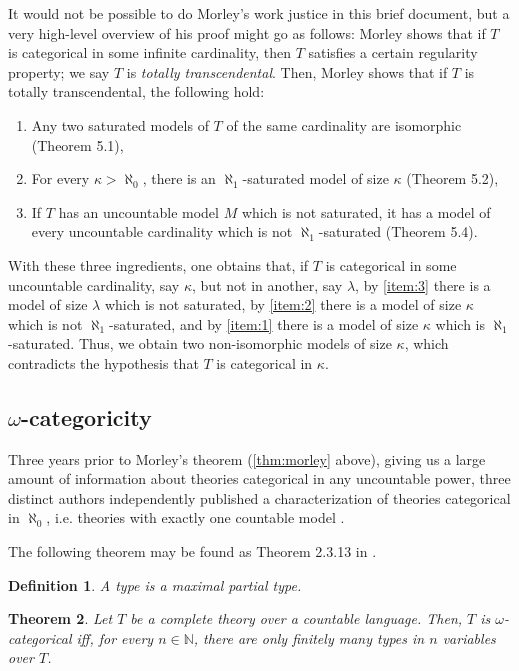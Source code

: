 \documentclass{article}
\newtheorem{theorem}{Theorem}[section]
\newtheorem{definition}[theorem]{Definition}
\theoremstyle{nonumberplain}
\newcommand{\N}{\mathbb{N}}
\begin{document}
It would not be possible to do Morley's work justice in this brief document, but a very high-level overview of his proof might go as follows: Morley shows that if $T$ is categorical in some infinite cardinality, then $T$ satisfies a certain regularity property; we say $T$ is \emph{totally transcendental}. Then, Morley shows that if $T$ is totally transcendental, the following hold:
\begin{enumerate}
\item\label{item:3} Any two saturated models of $T$ of the same cardinality are isomorphic (Theorem 5.1),
\item\label{item:1} For every $\kappa > \aleph_0$, there is an $\aleph_1$-saturated model of size $\kappa$ (Theorem 5.2),
\item	\label{item:2} If $T$ has an uncountable model $M$ which is not saturated, it has a model of every uncountable cardinality which is not $\aleph_1$-saturated (Theorem 5.4).
\end{enumerate}

With these three ingredients, one obtains that, if $T$ is categorical in some uncountable cardinality, say $\kappa$, but not in another, say $\lambda$, by \ref{item:3} there is a model of size $\lambda$ which is not saturated, by \ref{item:2} there is a model of size $\kappa$ which is not $\aleph_1$-saturated, and by \ref{item:1} there is a model of size $\kappa$ which is $\aleph_1$-saturated. Thus, we obtain two non-isomorphic models of size $\kappa$, which contradicts the hypothesis that $T$ is categorical in $\kappa$.

\subsection{$\omega$-categoricity}

Three years prior to Morley's theorem (\ref{thm:morley} above), giving us a large amount of information about theories categorical in any uncountable power, three distinct authors independently published a characterization of theories categorical in $\aleph_0$, i.e. theories with exactly one countable model \cite{primersimpletheories}.

The following theorem may be found as Theorem 2.3.13 in \cite{cnk}.

\begin{definition}
A \emph{type} is a maximal partial type.
\end{definition}

\begin{theorem}\label{thm:omegacat}
Let $T$ be a complete theory over a countable language. Then, $T$ is $\omega$-categorical iff, for every $n \in \N$, there are only finitely many types in $n$ variables over $T$.
\end{theorem}
\end{document}

